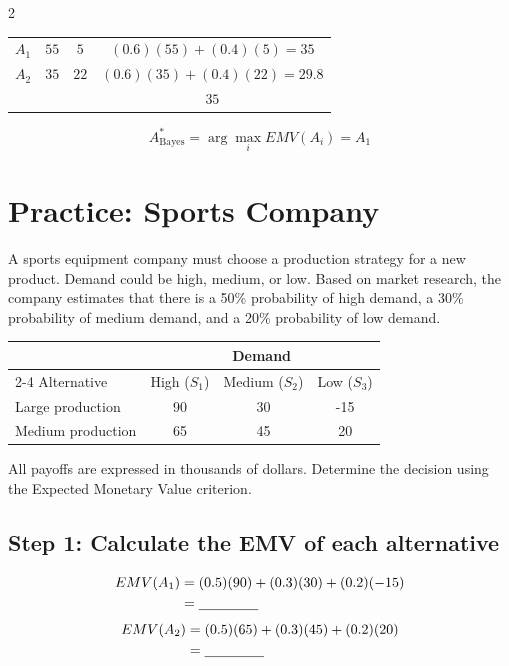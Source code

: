 \begin{multicols}{2}
\begin{center}
\begin{tabular}{lccc}
				$A_1$
				& $55$
				& $5$
				&
				$(0.6)(55)+(0.4)(5)=35$
				\\
				
				$A_2$
				& $35$
				& $22$
				&
				$(0.6)(35)+(0.4)(22)=29.8$
				\\
				
				\midrule
				
				\text{Highest EMV}
				& &
				& $35$
				\\
				
				\bottomrule
			\end{tabular}
		\end{center}
		\[
		A^*_{\mathrm{Bayes}}
		=
		\arg\max_i EMV(A_i)
		=
		A_1
		\] \vspace{-3mm}
		
		
		\section{Practice: Sports Company}
		A sports equipment company must choose a production strategy for a new
		product. Demand could be high, medium, or low. Based on market research,
		the company estimates that there is a 50\% probability of high demand,
		a 30\% probability of medium demand, and a 20\% probability of low demand. \vspace{-8mm}
		\begin{center}
			\renewcommand{\arraystretch}{1.3}
			\small
			\begin{tabular}{lccc}
				\toprule
				& \multicolumn{3}{c}{Demand} \\
				\cmidrule(lr){2-4}
				Alternative & High ($S_1$) & Medium ($S_2$) & Low ($S_3$) \\
				\midrule
				Large production  & 90 & 30 & -15 \\
				Medium production & 65 & 45 & 20 \\
				\bottomrule
			\end{tabular}
		\end{center} \vspace{-2mm}
		All payoffs are expressed in thousands of dollars. Determine the
		decision using the Expected Monetary Value criterion.
		
		\subsection*{Step 1: Calculate the EMV of each alternative}
		\[
		\begin{aligned}
			EMV(A_1)
			&=
			(0.5)(90)+(0.3)(30)+(0.2)(-15)
			\\
			&=
			\underline{\hspace{1.5cm}}
		\end{aligned}
		\]
		\[
		\begin{aligned}
			EMV(A_2)
			&=
			(0.5)(65)+(0.3)(45)+(0.2)(20)
			\\
			&=
			\underline{\hspace{1.5cm}}
		\end{aligned}
		\]
		

\end{multicols}

